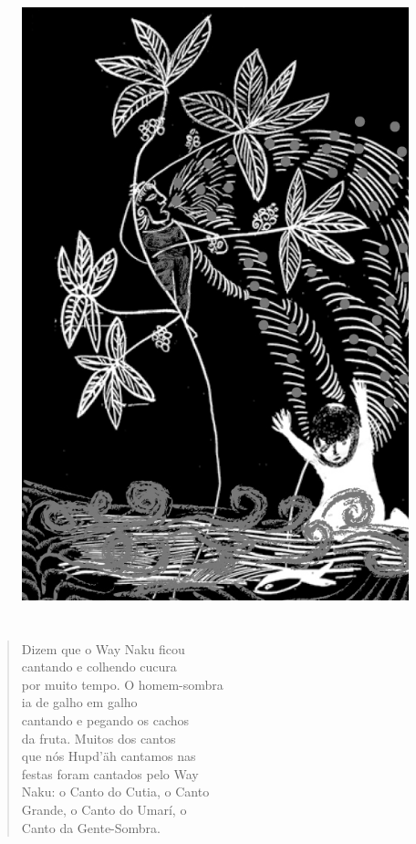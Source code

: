 \begin{figure}
\vspace*{-1.2cm}
\hspace*{-2.2cm}\includegraphics[width=138mm]{./imgs/img2.jpg}
\end{figure}

\chapter*{}

\mbox{}\vspace*{\fill}

\begin{verse}
Dizem que o Way Naku ficou\\
cantando e colhendo cucura\\
por muito tempo. O homem-sombra\\
ia de galho em galho\\
cantando e pegando os cachos\\
da fruta. Muitos dos cantos\\
que nós Hupd’äh cantamos nas\\
festas foram cantados pelo Way\\
Naku: o Canto do Cutia, o Canto\\
Grande, o Canto do Umarí, o\\
Canto da Gente-Sombra.
\end{verse}

